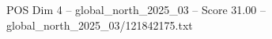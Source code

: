 \begin{textsample}{POS Dim 4 – global\_north\_2025\_03 – Score 31.00 – global\_north\_2025\_03/121842175.txt}
\end{textsample}
